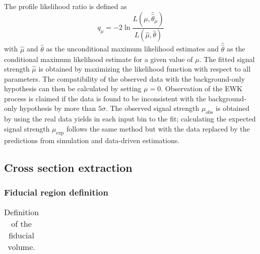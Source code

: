 The profile likelihood ratio is defined as
\begin{equation}
  q_{\mu} = -2\ln\frac{L(\mu,\hat{\hat{\theta}}_{\mu})}{L(\hat{\mu},\hat{\theta})}
  \label{dq:ssww13tev_xsec_test_statistic}
\end{equation}
with $\hat{\mu}$ and $\hat{\theta}$ as the unconditional maximum likelihood estimates and $\hat{\hat{\theta}}$ as the conditional maximum likelihood estimate for a given value of $\mu$.
The fitted signal strength $\hat{\mu}$ is obtained by maximizing the likelihood function with respect to all parameters.
The compatibility of the observed data with the background-only hypothesis can then be calculated by setting $\mu=0$.
Observation of the \ssww EWK process is claimed if the data is found to be inconsistent with the background-only hypothesis by more than $5\sigma$.
The observed signal strength $\mu_{\textrm{obs}}$ is obtained by using the real data yields in each input bin to the fit; calculating the expected signal strength $\mu_{\textrm{exp}}$ follows the same method but with the data replaced by the predictions from simulation and data-driven estimations.

\subsection{Cross section extraction}\label{ssww13tev:xsec_method}

\subsubsection{Fiducial region definition}\label{ssww13tev:fiducial_def}

\begin{table}[htbp]
  \centering
  \begin{tabular}{c}
    
  \end{tabular}
  \caption{Definition of the fiducial volume.}
  \label{tab:ssww13tev_fiducial_vol}
\end{table}
